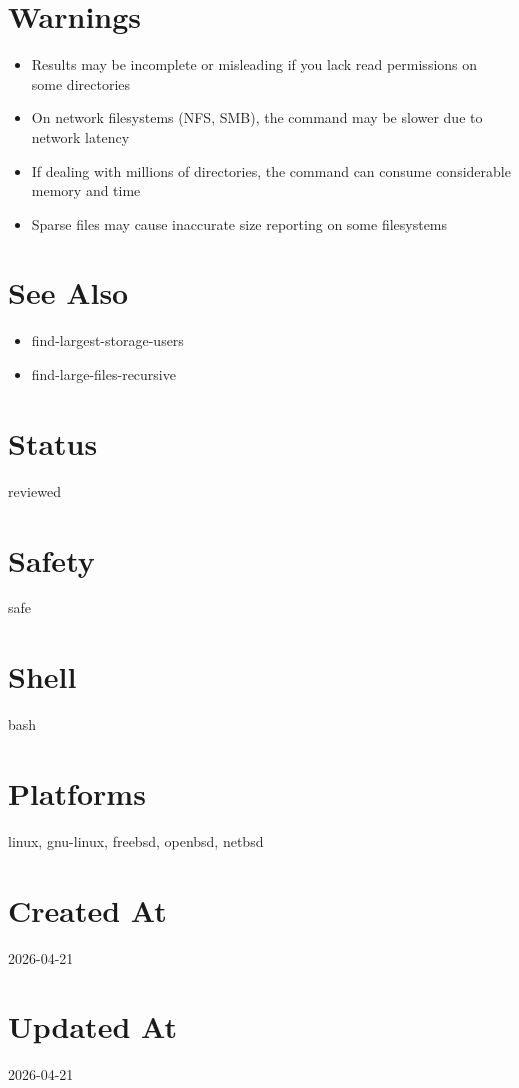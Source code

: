 \documentclass[openany]{book}
\begin{document}
\section*{Warnings}
\begin{itemize}
  \item Results may be incomplete or misleading if you lack read permissions on some directories
  \item On network filesystems (NFS, SMB), the command may be slower due to network latency
  \item If dealing with millions of directories, the command can consume considerable memory and time
  \item Sparse files may cause inaccurate size reporting on some filesystems
\end{itemize}

\section*{See Also}
\begin{itemize}
  \item find-largest-storage-users
  \item find-large-files-recursive
\end{itemize}

\section*{Status}
reviewed

\section*{Safety}
safe

\section*{Shell}
bash

\section*{Platforms}
linux, gnu-linux, freebsd, openbsd, netbsd

\section*{Created At}
2026-04-21

\section*{Updated At}
2026-04-21
\end{document}

